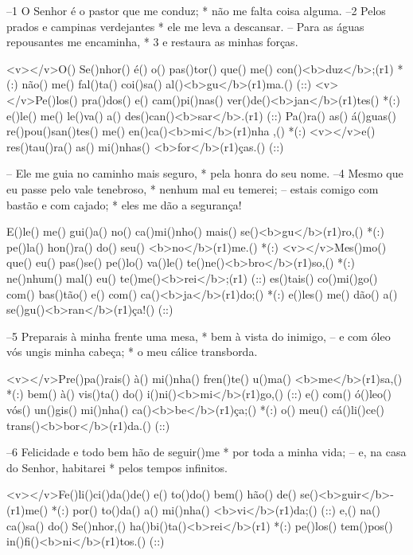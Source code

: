 –1 O Senhor é o pastor que me conduz; *
não me falta coisa alguma.
–2 Pelos prados e campinas verdejantes *
ele me leva a descansar.
– Para as águas repousantes me encaminha, *
3 e restaura as minhas forças.

<v></v>O() Se()nhor() é() o() pas()tor() que() me() con()<b>duz</b>;(r1) *(:)
não() me() fal()ta() coi()sa() al()<b>gu</b>(r1)ma.() (::)
<v></v>Pe()los() pra()dos() e() cam()pi()nas() ver()de()<b>jan</b>(r1)tes() *(:)
e()le() me() le()va() a() des()can()<b>sar</b>.(r1) (::)
Pa()ra() as() á()guas() re()pou()san()tes() me() en()ca()<b>mi</b>(r1)nha
,() *(:)
<v></v>e() res()tau()ra() as() mi()nhas() <b>for</b>(r1)ças.() (::)

– Ele me guia no caminho mais seguro, *
pela honra do seu nome.
–4 Mesmo que eu passe pelo vale tenebroso, *
nenhum mal eu temerei;
– estais comigo com bastão e com cajado; *
eles me dão a segurança!

E()le() me() gui()a() no() ca()mi()nho() mais() se()<b>gu</b>(r1)ro,() *(:)
pe()la() hon()ra() do() seu() <b>no</b>(r1)me.() *(:)
<v></v>Mes()mo() que() eu() pas()se() pe()lo() va()le() te()ne()<b>bro</b>(r1)so,() *(:)
ne()nhum() mal() eu() te()me()<b>rei</b>;(r1) (::)
es()tais() co()mi()go() com() bas()tão() e() com() ca()<b>ja</b>(r1)do;() *(:)
e()les() me() dão() a() se()gu()<b>ran</b>(r1)ça!() (::)

–5 Preparais à minha frente uma mesa, *
bem à vista do inimigo,
– e com óleo vós ungis minha cabeça; *
o meu cálice transborda.

<v></v>Pre()pa()rais() à() mi()nha() fren()te() u()ma() <b>me</b>(r1)sa,() *(:)
bem() à() vis()ta() do() i()ni()<b>mi</b>(r1)go,() (::)
e() com() ó()leo() vós() un()gis() mi()nha() ca()<b>be</b>(r1)ça;() *(:)
o() meu() cá()li()ce() trans()<b>bor</b>(r1)da.() (::)

–6 Felicidade e todo bem hão de seguir()me *
por toda a minha vida;
– e, na casa do Senhor, habitarei *
pelos tempos infinitos.

<v></v>Fe()li()ci()da()de() e() to()do() bem() hão() de() se()<b>guir</b>-(r1)me() *(:)
por() to()da() a() mi()nha() <b>vi</b>(r1)da;() (::)
e,() na() ca()sa() do() Se()nhor,() ha()bi()ta()<b>rei</b>(r1) *(:)
pe()los() tem()pos() in()fi()<b>ni</b>(r1)tos.() (::)
